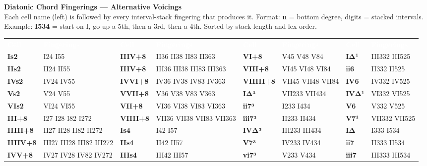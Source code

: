 \documentclass[12pt]{article}
\begin{document}
{\Large\bfseries Diatonic Chord Fingerings --- Alternative Voicings}\\[2pt]
{\small Each cell name (left) is followed by every interval-stack fingering that produces it. Format: \textbf{n} = bottom degree, digits = stacked intervals. Example: \textbf{I534} = start on I, go up a 5th, then a 3rd, then a 4th. Sorted by stack length and lex order.}
\vspace{4pt}

\fontsize{13}{16}\selectfont
\begin{tabular}{@{}l l l l l l l l@{}}
\rowcolor{hdr}
\textcolor{white}{\bfseries Cell} & \textcolor{white}{\bfseries Fingerings} & \textcolor{white}{\bfseries Cell} & \textcolor{white}{\bfseries Fingerings} & \textcolor{white}{\bfseries Cell} & \textcolor{white}{\bfseries Fingerings} & \textcolor{white}{\bfseries Cell} & \textcolor{white}{\bfseries Fingerings} \\
\bfseries Is2 & I24  I55 & \bfseries IIIV+8 & II36  II38  II83  II363 & \bfseries VI+8 & V45  V48  V84 & \bfseries IΔ¹ & III332  III525 \\
\bfseries IIs2 & II24  II55 & \bfseries IIIV+8 & III36  III38  III83  III363 & \bfseries VIII+8 & VI45  VI48  VI84 & \bfseries ii6 & II332  II525 \\
\bfseries IVs2 & IV24  IV55 & \bfseries IVVI+8 & IV36  IV38  IV83  IV363 & \bfseries VIIIII+8 & VII45  VII48  VII84 & \bfseries IV6 & IV332  IV525 \\
\bfseries Vs2 & V24  V55 & \bfseries VVII+8 & V36  V38  V83  V363 & \bfseries IΔ³ & VII233  VII434 & \bfseries IVΔ¹ & VI332  VI525 \\
\bfseries VIs2 & VI24  VI55 & \bfseries VII+8 & VI36  VI38  VI83  VI363 & \bfseries ii7³ & I233  I434 & \bfseries V6 & V332  V525 \\
\bfseries III+8 & I27  I28  I82  I272 & \bfseries VIIII+8 & VII36  VII38  VII83  VII363 & \bfseries iii7³ & II233  II434 & \bfseries V7¹ & VII332  VII525 \\
\bfseries IIIII+8 & II27  II28  II82  II272 & \bfseries Is4 & I42  I57 & \bfseries IVΔ³ & III233  III434 & \bfseries IΔ & I333  I534 \\
\bfseries IIIIV+8 & III27  III28  III82  III272 & \bfseries IIs4 & II42  II57 & \bfseries V7³ & IV233  IV434 & \bfseries ii7 & II333  II534 \\
\bfseries IVV+8 & IV27  IV28  IV82  IV272 & \bfseries IIIs4 & III42  III57 & \bfseries vi7³ & V233  V434 & \bfseries iii7 & III333  III534 \\

\end{tabular}
\end{document}

